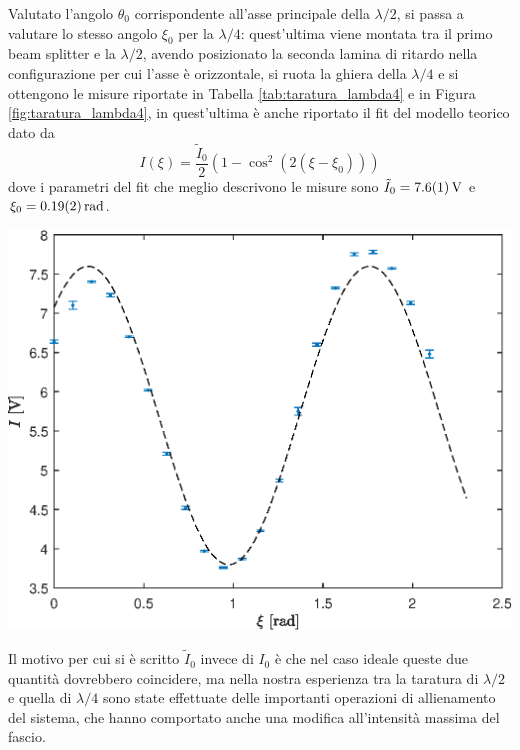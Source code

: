 \documentclass[10pt,oneside,a4paper]{article}
\newenvironment{Figure}
  {\par\medskip\noindent\minipage{\linewidth}}
  {\endminipage\par\medskip}
\begin{document}
\begin{multicols}{2}
Valutato l'angolo $\theta_0$ corrispondente all'asse principale della $\lambda/2$, si passa a valutare lo stesso angolo $\xi_0$ per la $\lambda/4$: quest'ultima viene montata tra il primo beam splitter e la $\lambda/2$, avendo posizionato la seconda lamina di ritardo nella configurazione per cui l'asse è orizzontale, si ruota la ghiera della $\lambda/4$ e si ottengono le misure riportate in Tabella \ref{tab:taratura_lambda4} e in Figura \ref{fig:taratura_lambda4}, in quest'ultima è anche riportato il fit del modello teorico dato da
\begin{equation}
	I(\xi) = \frac{\tilde{I}_0}{2}\left( 1- \cos^2\left(2\left(\xi-\xi_0\right)\right)\right)
\end{equation}
dove i parametri del fit che meglio descrivono le misure sono $\tilde{I}_0 = \SI{7.6\pm0.1}{V}$ e $\xi_0 = \SI{0.19\pm0.02}{rad}$.
\begin{Figure}
	\begin{center}
	\includegraphics[width=\linewidth]{taratura_lambda4.eps}
	\label{fig:taratura_lambda4}
	\end{center}
\end{Figure}
Il motivo per cui si è scritto $\tilde{I}_0$ invece di $I_0$ è che nel caso ideale queste due quantità dovrebbero coincidere, ma nella nostra esperienza tra la taratura di $\lambda/2$ e quella di $\lambda/4$ sono state effettuate delle importanti operazioni di allienamento del sistema, che hanno comportato anche una modifica all'intensità massima del fascio.


\end{multicols}
\end{document}
